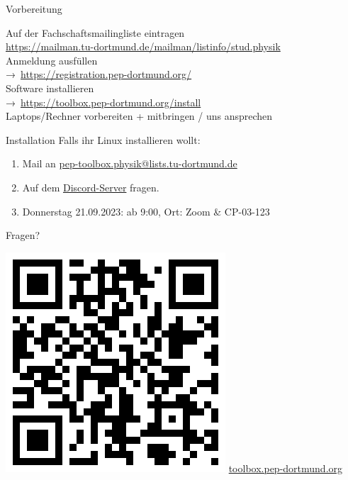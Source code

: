 \begin{frame}{Vorbereitung}
  \begin{center}
    \huge
    Auf der Fachschaftsmailingliste eintragen \\
    \url{https://mailman.tu-dortmund.de/mailman/listinfo/stud.physik}\\[0.5\baselineskip]
    Anmeldung ausfüllen\\
    →~\textcolor{blue!70!black}{\url{https://registration.pep-dortmund.org/}}\\[0.5\baselineskip]
    Software installieren\\
    →~\textcolor{blue!70!black}{\url{https://toolbox.pep-dortmund.org/install}}\\[0.5\baselineskip]
    Laptops/Rechner vorbereiten + mitbringen / uns ansprechen
  \end{center}
\end{frame}
\begin{frame}{Installation}
  \huge
  Falls ihr Linux installieren wollt:\\[0.5\baselineskip]
  \begin{enumerate}
    \item Mail an \href{mailto:pep-toolbox.physik@lists.tu-dortmund.de}{pep-toolbox.physik@lists.tu-dortmund.de}
    \item Auf dem \href{https://discord.gg/Uyyscufy7r}{Discord-Server} fragen.
    \item Donnerstag 21.09.2023: ab 9:00, Ort: Zoom \& CP-03-123
  \end{enumerate}
\end{frame}
\begin{frame}
  \begin{minipage}{.5\textwidth}
    \Huge\centering
    \textcolor{red!70!black}{Fragen?}
  \end{minipage}
  \begin{minipage}{.49\textwidth}
    \centering
    \includegraphics[width=.8\textwidth]{../qrcode/toolbox_qrcode.png}
    \Large
    \url{toolbox.pep-dortmund.org}
  \end{minipage}
\end{frame}

